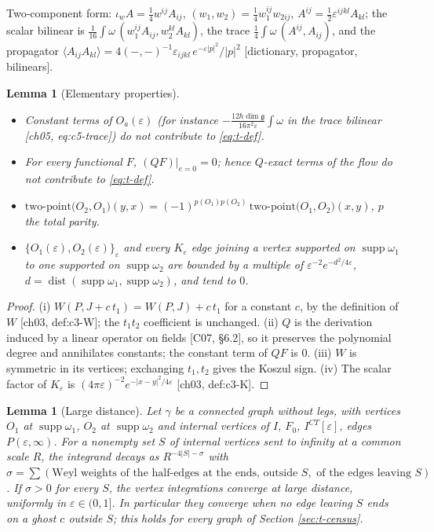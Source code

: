 \documentclass[11pt]{report}
\theoremstyle{plain}
\newtheorem{lemma}[theorem]{Lemma}
\theoremstyle{definition}
\numberwithin{equation}{chapter}
\newcommand{\TP}[2]{\mathrm{two\mbox{-}point}\big(#1,#2\big)}
\begin{document}
Two-component form: $\iota_wA=\tfrac14w^{ij}A_{ij}$, $(w_1,w_2)=\tfrac14w_1^{ij}w_{2ij}$, $A^{ij}=\tfrac12\varepsilon^{ijkl}A_{kl}$; the scalar bilinear is $\tfrac1{16}\int\omega\,(w_1^{ij}A_{ij},w_2^{kl}A_{kl})$, the trace $\tfrac14\int\omega\,(A^{ij},A_{ij})$, and the propagator $\langle A_{ij}A_{kl}\rangle=4(-,-)^{-1}\varepsilon_{ijkl}\,e^{-\varepsilon|p|^2}/|p|^2$ [dictionary, propagator, bilinears].

\begin{lemma}[Elementary properties]
\label{lem:t-elem}
\begin{itemize}
\item[(i)] Constant terms of $O_a(\varepsilon)$ (for instance $-\tfrac{12\hbar\dim\mathfrak g}{16\pi^2\varepsilon}\int\omega$ in the trace bilinear [ch05, eq:c5-trace]) do not contribute to \eqref{eq:t-def}.
\item[(ii)] For every functional $F$, $(QF)|_{e=0}=0$; hence $Q$-exact terms of the flow do not contribute to \eqref{eq:t-def}.
\item[(iii)] $\TP{O_2}{O_1}(y,x)=(-1)^{p(O_1)p(O_2)}\,\TP{O_1}{O_2}(x,y)$, $p$ the total parity.
\item[(iv)] $\{O_1(\varepsilon),O_2(\varepsilon)\}_\varepsilon$ and every $K_\varepsilon$ edge joining a vertex supported on $\operatorname{supp}\omega_1$ to one supported on $\operatorname{supp}\omega_2$ are bounded by a multiple of $\varepsilon^{-2}e^{-d^2/4\varepsilon}$, $d=\operatorname{dist}(\operatorname{supp}\omega_1,\operatorname{supp}\omega_2)$, and tend to $0$.
\end{itemize}
\end{lemma}

\begin{proof}
(i) $W(P,J+c\,t_1)=W(P,J)+c\,t_1$ for a constant $c$, by the definition of $W$ [ch03, def:c3-W]; the $t_1t_2$ coefficient is unchanged. (ii) $Q$ is the derivation induced by a linear operator on fields [C07, \S6.2], so it preserves the polynomial degree and annihilates constants; the constant term of $QF$ is $0$. (iii) $W$ is symmetric in its vertices; exchanging $t_1,t_2$ gives the Koszul sign. (iv) The scalar factor of $K_\varepsilon$ is $(4\pi\varepsilon)^{-2}e^{-|x-y|^2/4\varepsilon}$ [ch03, def:c3-K].
\end{proof}

\begin{lemma}[Large distance]
\label{lem:t-ir}
Let $\gamma$ be a connected graph without legs, with vertices $O_1$ at $\operatorname{supp}\omega_1$, $O_2$ at $\operatorname{supp}\omega_2$ and internal vertices of $I$, $F_0$, $I^{CT}[\varepsilon]$, edges $P(\varepsilon,\infty)$. For a nonempty set $S$ of internal vertices sent to infinity at a common scale $R$, the integrand decays as $R^{-4|S|-\sigma}$ with $\sigma=\sum(\text{Weyl weights of the half-edges at the ends, outside }S,\text{ of the edges leaving }S)$. If $\sigma>0$ for every $S$, the vertex integrations converge at large distance, uniformly in $\varepsilon\in(0,1]$. In particular they converge when no edge leaving $S$ ends on a ghost $c$ outside $S$; this holds for every graph of Section \ref{sec:t-census}.
\end{lemma}
\end{document}
